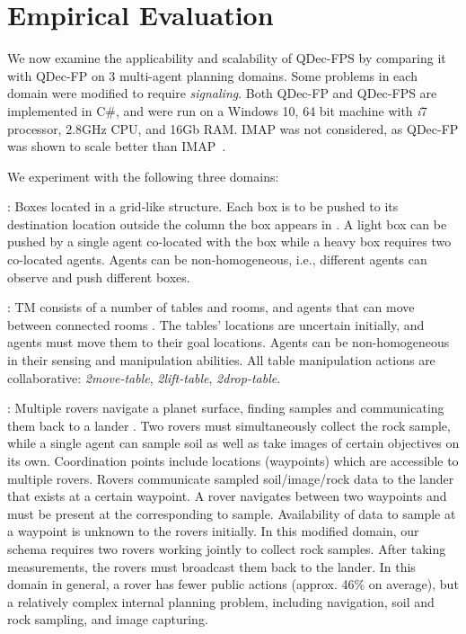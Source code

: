 \documentclass[letterpaper]{article}
\theoremstyle{definition}
\begin{document}
\section{Empirical Evaluation}

We now examine the applicability and scalability of QDec-FPS by comparing it with QDec-FP on 3 multi-agent planning domains.
Some problems in each domain were modified to require \emph{signaling}.
Both QDec-FP and QDec-FPS are  implemented in C\#, and were run on a Windows 10, 64 bit machine with \emph{i}7 processor, 2.8GHz CPU, and 16Gb RAM.
IMAP was not considered, as QDec-FP was  shown to scale better than IMAP~\citep{IMAP}.

We experiment with the following three domains:

: Boxes located in a grid-like structure. Each box is to be pushed to its destination location
outside the column the box appears in \citep{BrafmanSZ13}.
A light box can be pushed by a single agent co-located with the box while a heavy box requires two co-located agents.
Agents can be non-homogeneous, i.e., different agents can observe and push different boxes.

: TM consists of a number of tables and rooms, and agents that can move between connected rooms \citep{ShekharB20}.
The tables' locations are uncertain initially, and agents must move them to their goal locations.
Agents can be non-homogeneous in their sensing and manipulation abilities.
All table manipulation actions are collaborative:
\emph{2move-table}, \emph{2lift-table}, \emph{2drop-table}.

:
Multiple rovers navigate a planet surface, finding samples and communicating them back to a lander \citep{IMAP}.
Two rovers must simultaneously collect the rock sample, while a single agent can sample soil as well as take images of certain objectives on its own.
Coordination points include locations (waypoints) which are accessible to multiple rovers. Rovers communicate sampled soil/image/rock data to the lander that exists at a certain waypoint.
A rover navigates between two waypoints
and must be present at the corresponding %
to sample.
Availability of data to sample at a waypoint is unknown to the rovers initially.
In this modified domain, our schema requires two rovers working jointly to collect rock samples. After taking measurements, the rovers must broadcast them back to the lander.
In this domain in general, a rover has fewer public actions (approx. 46\% on average), but a relatively complex internal planning problem, including navigation, soil and rock sampling, and image capturing.
\end{document}
